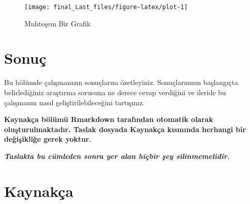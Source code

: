 \documentclass[
]{article}
\newlength{\cslhangindent}
\newlength{\cslentryspacingunit} %
\newenvironment{CSLReferences}[2] %
 {%
  \setlength{\parindent}{0pt}
  \ifodd #1
  \let\oldpar\par
  \def\par{\hangindent=\cslhangindent\oldpar}
  \fi
  \setlength{\parskip}{#2\cslentryspacingunit}
 }%
 {}
\begin{document}
\begin{figure}

{\centering \texttt{[image: final\_Last\_files/figure-latex/plot-1]} 

}

\caption{Muhteşem Bir Grafik}\label{fig:plot}
\end{figure}

\hypertarget{sonuuxe7}{%
\section{Sonuç}\label{sonuuxe7}}

Bu bölümde çalışmanızın sonuçlarını özetleyiniz. Sonuçlarınızın
başlangıçta belirlediğiniz araştırma sorusuna ne derece cevap verdiğini
ve ileride bu çalışmanın nasıl geliştirilebileceğini tartışınız.

\textbf{Kaynakça bölümü Rmarkdown tarafından otomatik olarak
oluşturulmaktadır. Taslak dosyada Kaynakça kısmında herhangi bir
değişikliğe gerek yoktur.}

\textbf{\emph{Taslakta bu cümleden sonra yer alan hiçbir şey
silinmemelidir.}}

\newpage

\hypertarget{references}{%
\section{Kaynakça}\label{references}}

\hypertarget{refs}{}
\begin{CSLReferences}{0}{0}
\end{CSLReferences}
\end{document}
